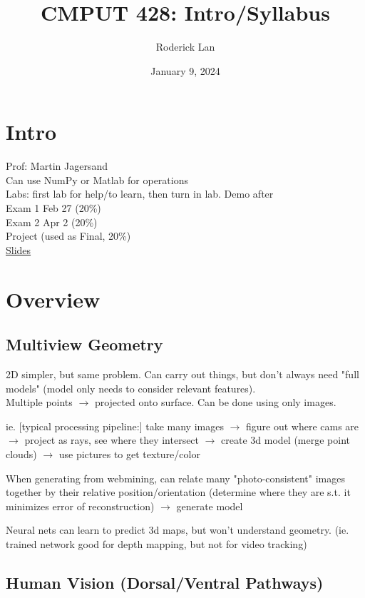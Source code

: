 \documentclass{article}
\title{CMPUT 428: Intro/Syllabus}
\author{Roderick Lan}
\date{January 9, 2024}
\begin{document}
\maketitle

\section*{Intro}
  Prof: Martin Jagersand \\
  Can use NumPy or Matlab for operations \\
  Labs: first lab for help/to learn, then turn in lab. Demo after \\[5pt]
  Exam 1 Feb 27 (20\%)\\
  Exam 2 Apr 2 (20\%)\\
  Project (used as Final, 20\%) \\
  \href{https://ugweb.cs.ualberta.ca/~vis/courses/CompVis/lectures22}{Slides}

\section{Overview}
\subsection{Multiview Geometry}
2D simpler, but same problem. Can carry out things, but don't always need "full models"
(model only needs to consider relevant features). \\
Multiple points $\rightarrow$ projected onto surface. Can be done using only images.
\begin{list}{-}{spacing}
  \item ie. [typical processing pipeline:] take many images $\rightarrow$ figure out where cams are $\rightarrow$ project as rays, see where they intersect $\rightarrow$ create 3d model (merge point clouds) $\rightarrow$ use pictures to get texture/color 
  \item When generating from webmining, can relate many "photo-consistent" images together by their relative position/orientation (determine where they are s.t. it minimizes error of reconstruction) $\rightarrow$ generate model
  \item Neural nets can learn to predict 3d maps, but won't understand geometry. (ie. trained network good for depth mapping, but not for video tracking)
\end{list}

\subsection{Human Vision (Dorsal/Ventral Pathways)}
\end{document}
